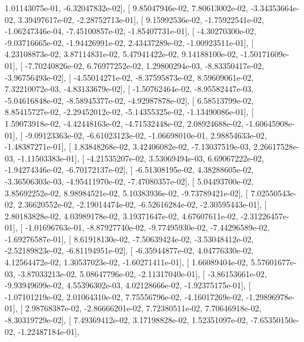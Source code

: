 \documentclass{article}
\begin{document}
          1.01143075e-01,  -6.32047832e-02],
       [  9.85047946e-02,   7.80613002e-02,  -3.34353664e-02,
          3.39497617e-02,  -2.28752713e-01],
       [  9.15992536e-02,  -1.75922541e-02,  -1.06247346e-04,
         -7.45100857e-02,  -1.85407731e-01],
       [ -4.30270300e-02,  -9.03716665e-02,  -1.94426991e-02,
          2.43437289e-02,  -1.00923511e-01],
       [  4.23108873e-02,   3.87114831e-02,   5.47941422e-02,
          9.14188100e-02,  -1.50171609e-01],
       [ -7.70240826e-02,   6.76977252e-02,   1.29800294e-03,
         -8.83350417e-02,  -3.96756493e-02],
       [ -4.55014271e-02,  -8.37595873e-02,   8.59609061e-02,
          7.32210072e-03,  -4.83133679e-02],
       [ -1.50762464e-02,  -8.95582447e-03,  -5.04616848e-02,
         -8.58945377e-02,  -4.92987878e-02],
       [  6.58513799e-02,   8.85415727e-02,  -2.29452012e-02,
         -5.14355325e-02,  -1.13490086e-01],
       [  1.59073918e-02,  -4.42448163e-02,  -4.71532448e-02,
          2.08924688e-02,  -1.60645908e-01],
       [ -9.09123363e-02,  -6.61023123e-02,  -1.06698010e-01,
          2.98854633e-02,  -1.48387271e-01],
       [  1.83848268e-02,   3.42406082e-02,  -7.13037519e-03,
          2.26617528e-03,  -1.11503383e-01],
       [ -4.21535207e-02,   3.53069494e-03,   6.69067222e-02,
         -1.94274346e-02,  -6.70172137e-02],
       [ -6.51308195e-02,   4.38288605e-02,  -3.36506303e-03,
         -4.95411970e-02,  -7.47080357e-02],
       [  5.04493700e-02,   3.85692252e-02,   8.98984521e-02,
          5.10383936e-02,  -9.73789421e-02],
       [  7.02550543e-02,   2.36620552e-02,  -2.19014474e-02,
         -6.52616284e-02,  -2.30595443e-01],
       [  2.80183828e-02,   4.03989178e-02,   3.19371647e-02,
          4.67607611e-02,  -2.31226457e-01],
       [ -1.01696763e-01,  -8.87927740e-02,  -9.77495930e-02,
         -7.44296589e-02,  -1.69276587e-01],
       [  8.61918130e-02,  -7.50639424e-02,  -3.53048412e-02,
         -2.52189823e-02,  -6.81194951e-02],
       [ -6.35944877e-02,   4.04776330e-02,   4.12564472e-02,
          1.30537023e-02,  -1.60271411e-01],
       [  1.66089404e-02,   5.57601677e-03,  -3.87033213e-02,
          5.08647796e-02,  -2.11317040e-01],
       [ -3.86153661e-02,  -9.93949699e-02,   4.55396302e-03,
          4.02128666e-02,  -1.92375175e-01],
       [ -1.07101219e-02,   2.01064310e-02,   7.75556796e-02,
         -4.16017269e-02,  -1.29896978e-01],
       [  2.98768387e-02,  -2.86666201e-02,   7.72380511e-02,
          7.70646918e-02,  -8.30319729e-02],
       [  7.49369412e-02,   3.17198828e-02,   1.52351097e-02,
         -7.65350150e-02,  -1.22487184e-01],
\end{document}
